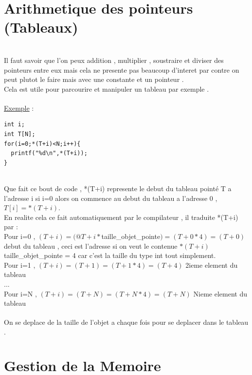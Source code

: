 \documentclass[a4paper,12pt,openany]{book}
\begin{document}
{\section{Arithmetique des pointeurs (Tableaux)}
\\
Il faut savoir que l'on peux addition , multiplier , soustraire et diviser des pointeurs entre eux mais cela ne presente pas beaucoup d'interet par contre on peut plutot le faire mais avec une constante et un pointeur .\\
Cela est utile pour parcourire et manipuler un tableau par exemple .\\
\\
\underline{Exemple} : \\
\begin{verbatim}
int i;
int T[N];
for(i=0;*(T+i)<N;i++){
  printf("%d\n",*(T+i));
}
\end{verbatim}
\\
Que fait ce bout de code , *(T+i) represente le debut du tableau point\'e T a l'adresse i si i=0 alors on commence au debut du tableau a l'adresse 0 , $T[i]=*(T+i)$.\\
En realite cela ce fait automatiquement par le compilateur , il traduite *(T+i) par :
\\
Pour i=0 , $(T+i)=(@T+i*$taille\_objet\_pointe$)=(T+0*4)=(T+0)$ debut du tableau , ceci est l'adresse si on veut le contenue $*(T+i)$ \\
taille\_objet\_pointe = 4 car c'est la taille du type int tout simplement.\\
Pour i=1 , $(T+i)=(T+1)=(T+1*4)=(T+4)$ 2ieme element du tableau \\
...\\
Pour i=N , $(T+i)=(T+N)=(T+N*4)=(T+N)$ Nieme element du tableau \\
\\
On se deplace de la taille de l'objet a chaque fois pour se deplacer dans le tableau .\\


\section{Gestion de la Memoire}

}
\end{document}
